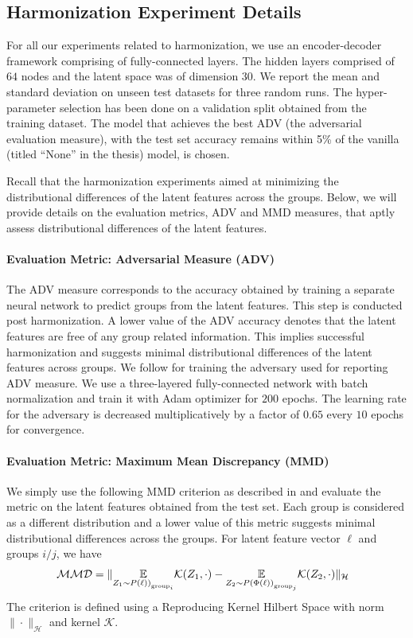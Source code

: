 \subsection{Harmonization Experiment Details}
For all our experiments related to harmonization, we use an encoder-decoder framework comprising of fully-connected layers. The hidden layers comprised of $64$ nodes and the latent space was of dimension $30$. We report the mean and standard deviation on unseen test datasets for three random runs. The hyper-parameter selection has been done on a validation split obtained from the training dataset. The model that achieves the best ADV (the adversarial evaluation measure), with the test set accuracy remains within 5\% of the vanilla (titled ``None'' in the thesis) model, is chosen. 

Recall that the harmonization experiments aimed at minimizing the distributional differences of the latent features across the groups. Below, we will provide details on the evaluation metrics, ADV and MMD measures, that aptly assess distributional differences of the latent features. 

\paragraph{Evaluation Metric: Adversarial Measure (ADV)}
The ADV measure corresponds to the accuracy obtained by training a separate neural network to predict groups from the latent features. This step is conducted post harmonization. A lower value of the ADV accuracy denotes that the latent features are free of any group related information. This implies successful harmonization and suggests minimal distributional differences of the latent features across groups. We follow \citep{cai} for training the adversary used for reporting ADV measure. We use a three-layered fully-connected network with batch normalization and train it with Adam optimizer for $200$ epochs. The learning rate for the adversary is decreased multiplicatively by a factor of $0.65$ every $10$ epochs for convergence. 


\paragraph{Evaluation Metric: Maximum Mean Discrepancy (MMD)}
We simply use the following MMD criterion as described in \citep{gretton2006kernel} and evaluate the metric on the latent features obtained from the test set. Each group is considered as a different distribution and a lower value of this metric suggests minimal distributional differences across the groups. For latent feature vector $\ell$ and groups $i/j$, we have 
\begin{align}
\label{mmd_eq}
    \hspace{-0.1in} \mathcal{MMD} = \|\underset{Z_1\sim P\left(\ell)\right)_{\text{group}_i}}{\EE} \mathcal{K}(Z_1, \cdot) - \underset{Z_2\sim P\left(\Phi(\ell)\right)_{\text{group}_j}}{\EE} \mathcal{K}(Z_2, \cdot)\|_{\mathcal{H}}
\end{align}
The criterion is defined using a Reproducing Kernel Hilbert Space with norm $\|\cdot\|_{\mathcal{H}}$ and kernel $\mathcal{K}$. 